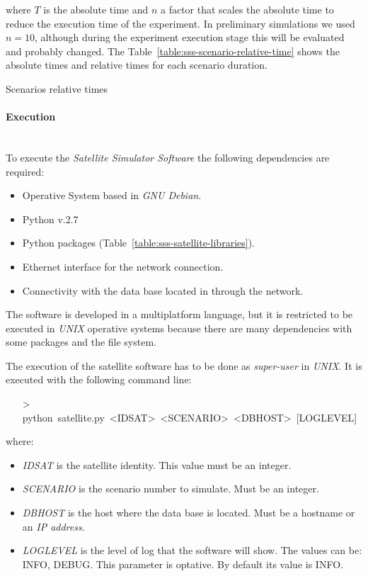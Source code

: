 where $T$ is the absolute time and $n$ a factor that scales the absolute time to
reduce the execution time of the experiment. In preliminary simulations we used
$n=10$, although during the experiment execution stage this will be evaluated
and probably changed. The Table~\ref{table:sss-scenario-relative-time} shows the absolute times and relative times for each scenario duration.


\begin{table}[hp]
  \centering
  {\small
  
  }
  \caption{Scenarios relative times}
  \label{table:sss-scenario-relative-time}
\end{table}


\paragraph{Execution}~\\
\label{par:sat-simulator-execution}
To execute the \emph{Satellite Simulator Software} the following dependencies are
required:
\begin{itemize}
\item Operative System based in \emph{GNU Debian}.
\item Python v.2.7
\item Python packages (Table~\ref{table:sss-satellite-libraries}).
\item Ethernet interface for the network connection.
\item Connectivity with the data base located in \bonfire through the network.
\end{itemize}
The \satss software is developed in a multiplatform language, but it is restricted to be executed in \emph{UNIX} operative systems because there are many dependencies with some packages and the file system.

The execution of the satellite software has to be done as \emph{super-user} in
\emph{UNIX}. It is executed with the following command line:
\begin{itemize}
\item[>] python~satellite.py~<IDSAT>~<SCENARIO>~<DBHOST>~[LOGLEVEL]
\end{itemize}

where:
\begin{itemize}
\item \emph{IDSAT} is the satellite identity. This value must be an integer.
\item \emph{SCENARIO} is the scenario number to simulate. Must be an integer.
\item \emph{DBHOST} is the host where the data base is located. Must be a hostname or an \emph{IP address}.
\item \emph{LOGLEVEL} is the level of log that the software will show. The values can be: INFO, DEBUG. This parameter is optative. By default its value is INFO.
\end{itemize}

